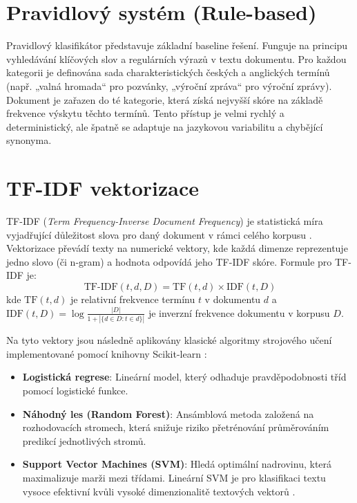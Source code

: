 \documentclass[czech, oth, kky, he, iso690alph, pdf, viewonly]{fasthesis}%
\begin{document}
\section{Pravidlový systém (Rule-based)}
Pravidlový klasifikátor představuje základní baseline řešení. Funguje na principu vyhledávání klíčových slov a regulárních výrazů v textu dokumentu. Pro každou kategorii je definována sada charakteristických českých a anglických termínů (např. „valná hromada“ pro pozvánky, „výroční zpráva“ pro výroční zprávy). Dokument je zařazen do té kategorie, která získá nejvyšší skóre na základě frekvence výskytu těchto termínů. Tento přístup je velmi rychlý a deterministický, ale špatně se adaptuje na jazykovou variabilitu a chybějící synonyma.

\section{TF-IDF vektorizace}
TF-IDF (\textsl{Term Frequency-Inverse Document Frequency}) je statistická míra vyjadřující důležitost slova pro daný dokument v rámci celého korpusu \cite{salton1988term}. Vektorizace převádí texty na numerické vektory, kde každá dimenze reprezentuje jedno slovo (či n-gram) a hodnota odpovídá jeho TF-IDF skóre.
Formule pro TF-IDF je:
\begin{equation}
    \text{TF-IDF}(t, d, D) = \text{TF}(t, d) \times \text{IDF}(t, D)
\end{equation}
kde $\text{TF}(t, d)$ je relativní frekvence termínu $t$ v dokumentu $d$ a $\text{IDF}(t, D) = \log \frac{|D|}{1 + |\{d \in D : t \in d\}|}$ je inverzní frekvence dokumentu v korpusu $D$.

Na tyto vektory jsou následně aplikovány klasické algoritmy strojového učení implementované pomocí knihovny Scikit-learn \cite{scikit-learn}:
\begin{itemize}
    \item \textbf{Logistická regrese}: Lineární model, který odhaduje pravděpodobnosti tříd pomocí logistické funkce.
    \item \textbf{Náhodný les (Random Forest)}: Ansámblová metoda založená na rozhodovacích stromech, která snižuje riziko přetrénování průměrováním predikcí jednotlivých stromů.
    \item \textbf{Support Vector Machines (SVM)}: Hledá optimální nadrovinu, která maximalizuje marži mezi třídami. Lineární SVM je pro klasifikaci textu vysoce efektivní kvůli vysoké dimenzionalitě textových vektorů \cite{cortes1995support}.
\end{itemize}
\end{document}
